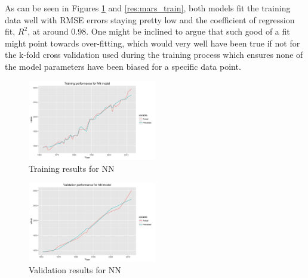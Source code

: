 \documentclass[conference]{IEEEtran}
\begin{document}
As can be seen in Figures \ref{res:ann_train} and \ref{res:mars_train}, both models fit the training data well with RMSE errors staying pretty low and the coefficient of regression fit, $R^2$, at around 0.98. One might be inclined to argue that such good of a fit might point towards over-fitting, which would very well have been true if not for the k-fold cross validation used during the training process which ensures none of the model parameters have been biased for a specific data point.
\begin{figure}[!h]
    \centering
    \includegraphics[width=0.5\textwidth]{avgnnet_training.png}
    \caption{Training results for NN}
    \label{res:ann_train}
\end{figure}
\begin{figure}[!h]
    \centering
    \includegraphics[width=0.5\textwidth]{avgnnet_validate.png}
    \caption{Validation results for NN}
    \label{res:ann_test}
\end{figure}
\end{document}
